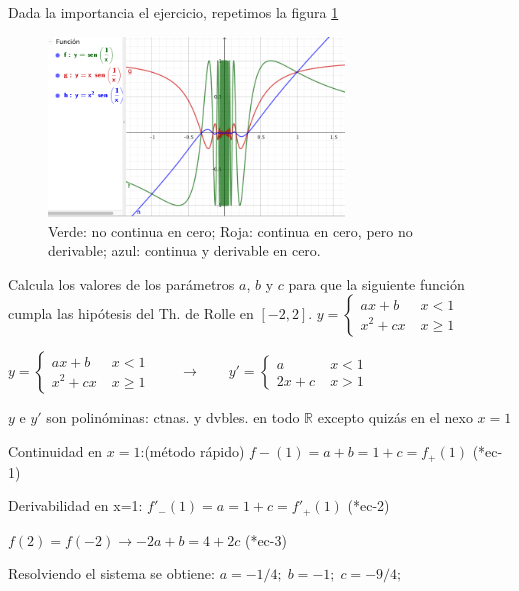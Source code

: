 \begin{proofw}
		
	Dada la importancia el ejercicio, repetimos la figura	 \ref{fig:ctndaddvbdad}
	
	\begin{figure}[H]
			\centering
			\includegraphics[width=0.7\textwidth]{imagenes/imagenes04/T04IM08.png}
			\caption{Verde: no continua en cero; Roja: continua en cero, pero no derivable; azul: continua y derivable en cero.}
			\label{fig:ctndaddvbdad}
		\end{figure}
		
	\end{proofw} 
		
	\begin{ejre} Calcula los valores de los parámetros $a$, $b$ y $c$ para que la siguiente función cumpla las hipótesis del Th. de Rolle en $[-2,2]$. 
	$y=\begin{cases}
	ax+b\; & x<1 \\
	x^2+cx\; & x\ge 1
	\end{cases}$	
	\end{ejre}
	
	\begin{proofw}\renewcommand{\qedsymbol}{$\diamond$}	
	$y=\begin{cases}
	ax+b\; & x<1 \\
	x^2+cx\; & x\ge 1
	\end{cases} \qquad \to \qquad y'=\begin{cases}
	a\; & x<1 \\
	2x+c\; & x > 1
	\end{cases}$
	
	$y$ e $y'$ son polinóminas: ctnas. y dvbles. en todo $\mathbb R$ excepto quizás en el nexo $x=1$
	
	Continuidad en $x=1$:(método rápido)  $f-(1)=a+b=1+c=f_+(1)$ (*ec-1) 
	
	Derivabilidad en x=1: $f'_-(1)=a=1+c=f'_+(1)$ (*ec-2)
	
	$f(2)=f(-2) \to -2a+b=4+2c$ (*ec-3)
	
	Resolviendo el sistema se obtiene: $a=-1/4 ;\; b=-1 ;\; c=-9/4 ;\; $
	\end{proofw}
	
